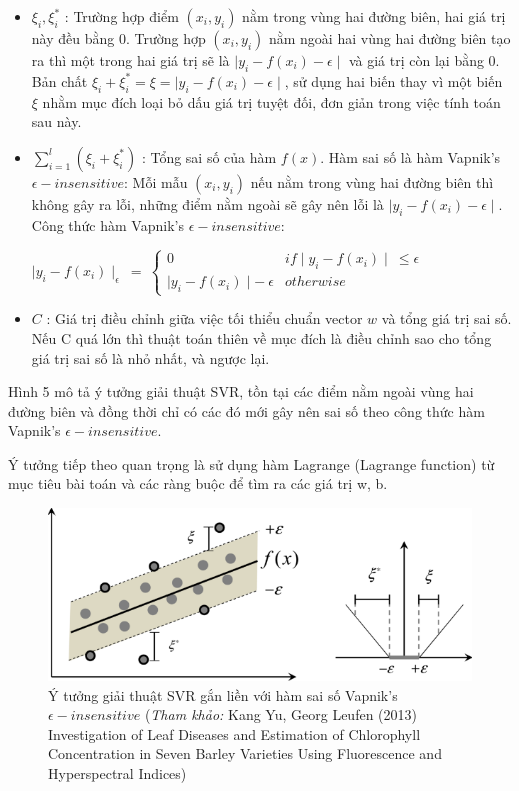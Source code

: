 \documentclass[12pt]{extarticle}
\begin{document}
				\begin{itemize}
					\item $\xi_{i}, \xi_i^*$ : Trường hợp điểm $(x_{i},y_{i})$ nằm trong vùng hai đường biên, hai giá trị này đều bằng 0. Trường hợp $(x_{i},y_{i})$ nằm ngoài hai vùng hai đường biên tạo ra thì một trong hai giá trị sẽ là $\mid y_{i} - f(x_{i})-\epsilon\mid$ và giá trị còn lại bằng 0. Bản chất  $\xi_{i} + \xi_i^ * = \xi= \mid y_{i} - f(x_{i})-\epsilon\mid$, sử dụng hai biến thay vì một biến $\xi$ nhằm mục đích loại bỏ dấu giá trị tuyệt đối, đơn giản trong việc tính toán sau này.
					\item $\sum_{i=1}^l(\xi_{i}+\xi_i^*)$ : Tổng sai số của hàm $f(x)$. Hàm sai số là hàm Vapnik's $\epsilon - insensitive$: Mỗi mẫu $(x_{i},y_{i})$ nếu nằm trong vùng hai đường biên thì không gây ra lỗi, những điểm nằm ngoài sẽ gây nên lỗi là $\mid y_{i} - f(x_{i})-\epsilon\mid$. Công thức hàm Vapnik's $\epsilon - insensitive$:
					\begin{center}
						$\mid y_{i} - f(x_{i})\mid_{\epsilon} \:=\:\begin{cases}0 &  if \mid y_{i} - f(x_{i})\mid \:\leq \epsilon\\\mid y_{i} - f(x_{i})\mid - \: \epsilon & otherwise\end{cases} $ 
					\end{center}
					\item $C$ : Giá trị điều chỉnh giữa việc tối thiểu chuẩn vector $w$ và tổng giá trị sai số. Nếu C quá lớn thì thuật toán thiên về mục đích là điều chỉnh sao cho tổng giá trị sai số là nhỏ nhất, và ngược lại.
				\end{itemize}
			\par Hình 5 mô tả ý tưởng giải thuật SVR, tồn tại các điểm nằm ngoài vùng hai đường biên và đồng thời  chỉ có các đó mới gây nên sai số theo công thức hàm  Vapnik's $\epsilon - insensitive$.
			\par Ý tưởng tiếp theo quan trọng là sử dụng hàm Lagrange (Lagrange function) từ mục tiêu bài toán và các ràng buộc để tìm ra các giá trị w, b.
				\begin{figure}[h!]
				\includegraphics[width=\linewidth]{svr}
				\caption[Ý tưởng giải thuật SVR gắn liền với hàm sai số Vapnik's $\epsilon - insensitive$]{Ý tưởng giải thuật SVR gắn liền với hàm sai số Vapnik's $\epsilon - insensitive$  
					(\textit{Tham khảo:} Kang Yu, Georg Leufen (2013) Investigation of Leaf Diseases and Estimation of Chlorophyll Concentration in Seven Barley Varieties Using Fluorescence and Hyperspectral Indices)}
				\label{fig:svr}
			\end{figure}
				
\end{document}
